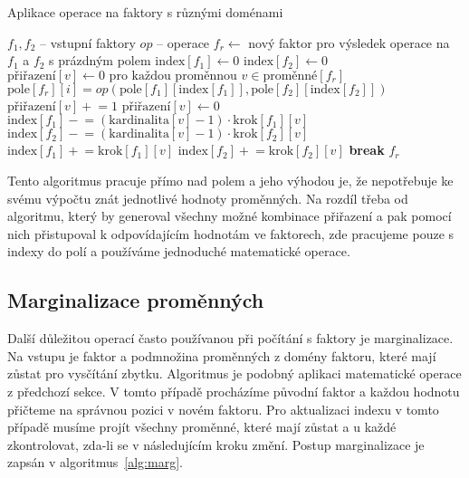 \begin{algorithm}
\caption{Aplikace operace na faktory s různými doménami}
\label{alg:apop}
\begin{algorithmic}
\State $f_1, f_2$ -- vstupní faktory
\State $op$ -- operace
\State
\State $f_r \gets$ nový faktor pro výsledek operace na $f_1$ a $f_2$ s prázdným polem
\State
\State $\text{index}[f_1] \gets 0$
\State $\text{index}[f_2] \gets 0$
\State $\text{přiřazení}[v] \gets 0 \text{ pro každou proměnnou } v \in \text{proměnné}[f_r]$
\State
{}
	\State $\text{pole}[f_r][i] = op(\text{pole}[f_1][\text{index}[f_1]], \text{pole}[f_2][\text{index}[f_2]])$
		\State $\text{přiřazení}[v] \mathrel{+}= 1$
			\State $\text{přiřazení}[v] \gets 0$
			\State $\text{index}[f_1] \mathrel{-}= (\text{kardinalita}[v] - 1) \cdot \text{krok}[f_1][v]$
			\State $\text{index}[f_2] \mathrel{-}= (\text{kardinalita}[v] - 1) \cdot \text{krok}[f_2][v]$
		\Else
			\State $\text{index}[f_1] \mathrel{+}= \text{krok}[f_1][v]$
			\State $\text{index}[f_2] \mathrel{+}= \text{krok}[f_2][v]$
			\State \textbf{break}
		\EndIf
	\EndFor
\EndFor
\State \Return $f_r$
\EndFunction
\end{algorithmic}
\end{algorithm}

Tento algoritmus pracuje přímo nad polem a jeho výhodou je, že nepotřebuje ke svému výpočtu znát jednotlivé hodnoty proměnných.
Na rozdíl třeba od algoritmu, který by generoval všechny možné kombinace přiřazení a pak pomocí nich přistupoval k odpovídajícím hodnotám ve faktorech, zde pracujeme pouze s indexy do polí a používáme jednoduché matematické operace.

\subsection{Marginalizace proměnných}

Další důležitou operací často používanou při počítání s faktory je marginalizace.
Na vstupu je faktor a podmnožina proměnných z domény faktoru, které mají zůstat pro vysčítání zbytku.
Algoritmus je podobný aplikaci matematické operace z předchozí sekce.
V tomto případě procházíme původní faktor a každou hodnotu přičteme na správnou pozici v novém faktoru.
Pro aktualizaci indexu v tomto případě musíme projít všechny proměnné, které mají zůstat a u každé zkontrolovat, zda-li se v následujícím kroku změní.
Postup marginalizace je zapsán v algoritmus~\ref{alg:marg}.

